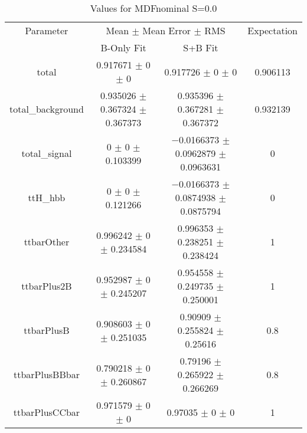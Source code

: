 \begin{table}
\centering
\caption{Values for MDFnominal S=0.0}
\begin{tabular}{cccc}
\toprule
Parameter & \multicolumn{2}{c}{Mean $\pm$ Mean Error $\pm$ RMS} & Expectation\\
 & B-Only Fit & S+B Fit & \\
\midrule
total & \num{0.917671} $\pm$ \num{0} $\pm$ \num{0} & \num{0.917726} $\pm$ \num{0} $\pm$ \num{0} & \num{0.906113}\\
total\_background & \num{0.935026} $\pm$ \num{0.367324} $\pm$ \num{0.367373} & \num{0.935396} $\pm$ \num{0.367281} $\pm$ \num{0.367372} & \num{0.932139}\\
total\_signal & \num{0} $\pm$ \num{0} $\pm$ \num{0.103399} & \num{-0.0166373} $\pm$ \num{0.0962879} $\pm$ \num{0.0963631} & \num{0}\\
ttH\_hbb & \num{0} $\pm$ \num{0} $\pm$ \num{0.121266} & \num{-0.0166373} $\pm$ \num{0.0874938} $\pm$ \num{0.0875794} & \num{0}\\
ttbarOther & \num{0.996242} $\pm$ \num{0} $\pm$ \num{0.234584} & \num{0.996353} $\pm$ \num{0.238251} $\pm$ \num{0.238424} & \num{1}\\
ttbarPlus2B & \num{0.952987} $\pm$ \num{0} $\pm$ \num{0.245207} & \num{0.954558} $\pm$ \num{0.249735} $\pm$ \num{0.250001} & \num{1}\\
ttbarPlusB & \num{0.908603} $\pm$ \num{0} $\pm$ \num{0.251035} & \num{0.90909} $\pm$ \num{0.255824} $\pm$ \num{0.25616} & \num{0.8}\\
ttbarPlusBBbar & \num{0.790218} $\pm$ \num{0} $\pm$ \num{0.260867} & \num{0.79196} $\pm$ \num{0.265922} $\pm$ \num{0.266269} & \num{0.8}\\
ttbarPlusCCbar & \num{0.971579} $\pm$ \num{0} $\pm$ \num{0} & \num{0.97035} $\pm$ \num{0} $\pm$ \num{0} & \num{1}\\
\bottomrule
\end{tabular}
\end{table}
